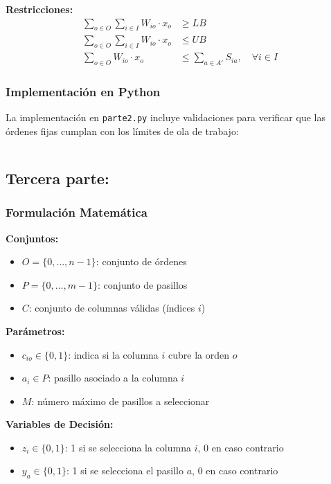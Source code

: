 \documentclass[a4paper,12pt]{article}
\begin{document}
\textbf{Restricciones:}
\begin{align}
\sum_{o \in O} \sum_{i \in I} W_{io} \cdot x_o &\geq LB \\
\sum_{o \in O} \sum_{i \in I} W_{io} \cdot x_o &\leq UB \\
\sum_{o \in O} W_{io} \cdot x_o &\leq \sum_{a \in A'} S_{ia}, \quad \forall i \in I
\end{align}

\subsubsection{Implementación en Python}

La implementación en \texttt{parte2.py} incluye validaciones para verificar que las órdenes fijas cumplan con los límites de ola de trabajo:

\begin{lstlisting}[language=Python, caption=Implementación clave de la segunda parte]

\end{lstlisting}

\subsection{Tercera parte:}
\label{sec:variante3}

\subsubsection{Formulación Matemática}

\textbf{Conjuntos:}
\begin{itemize}
    \item $O = \{0, \ldots, n-1\}$: conjunto de órdenes
    \item $P = \{0, \ldots, m-1\}$: conjunto de pasillos
    \item $C$: conjunto de columnas válidas (índices $i$)
\end{itemize}

\textbf{Parámetros:}
\begin{itemize}
    \item $c_{io} \in \{0,1\}$: indica si la columna $i$ cubre la orden $o$
    \item $a_i \in P$: pasillo asociado a la columna $i$
    \item $M$: número máximo de pasillos a seleccionar
\end{itemize}

\textbf{Variables de Decisión:}
\begin{itemize}
    \item $z_i \in \{0,1\}$: 1 si se selecciona la columna $i$, 0 en caso contrario
    \item $y_a \in \{0,1\}$: 1 si se selecciona el pasillo $a$, 0 en caso contrario
\end{itemize}
\end{document}
